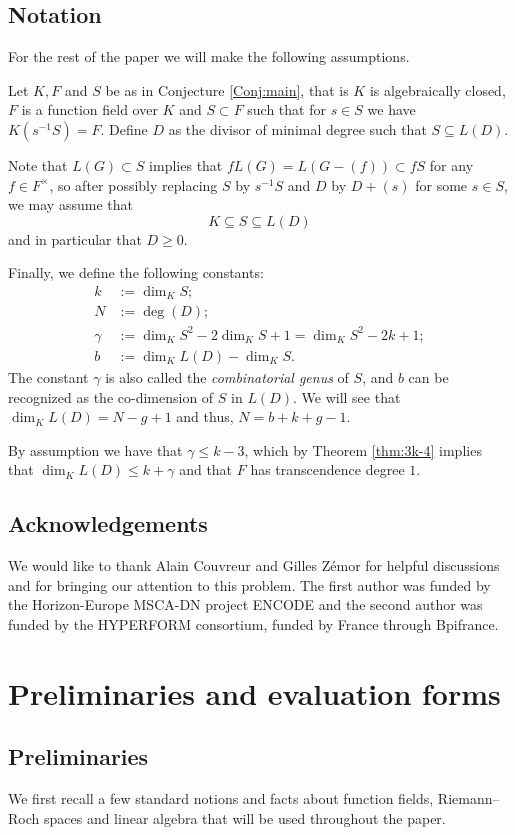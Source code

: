 \documentclass[12pt]{amsart}
\renewcommand{\leq}{\leqslant}
\theoremstyle{definition}
\begin{document}
	\subsection*{Notation}
	For the rest of the paper we will make the following assumptions. 
	
	Let $K, F$ and $S$ be as in Conjecture \ref{Conj:main}, that is $K$ is algebraically closed, $F$ is a function field over $K$ and $S\subset F$ such that for $s\in S$ we have $K(s^{-1}S) = F$. Define $D$ as the divisor of minimal degree such that $S \subseteq L(D).$ 
	
	Note that $L(G) \subset S$ implies that $fL(G) = L(G - (f)) \subset fS$ for any $f \in F^\times$, so after possibly replacing $S$ by $s^{-1}S$ and $D$ by $D + (s)$ for some $s\in S$, we may assume that
	$$K\subseteq S\subseteq L(D)$$
	and in particular that $ D\ge 0$.
	
	Finally, we define the following constants: 
	\begin{align*}
		k&:= \dim_K S;\\
		N &:= \deg (D); \\
		\gamma &:= \dim_K S^2 - 2\dim_K S + 1= \dim_K S^2 - 2k + 1; \\
		b &:= \dim_K L(D)  - \dim_K S.
	\end{align*}
	The constant $\gamma$ is also called the \textit{combinatorial genus} of $S$, and $b$ can be recognized as the co-dimension of $S$ in $L(D)$. We will see that $\dim_K L(D) = N - g + 1$ and thus, $N = b + k + g - 1.$
	
	By assumption we have that $\gamma \leq k-3$, which by Theorem \ref{thm:3k-4}  implies that $\dim_K L(D) \leq k + \gamma$ and that $F$ has transcendence degree $1$. 
	
	\subsection*{Acknowledgements}
	We would like to thank Alain Couvreur and Gilles Z\'emor for helpful discussions and for bringing our attention to this problem. The first author was funded by the Horizon-Europe MSCA-DN project ENCODE and the second author was funded by the HYPERFORM consortium, funded by France through Bpifrance.
	
	\section{Preliminaries and evaluation forms}\label{sec:pre}
	\subsection{Preliminaries}
	We first recall a few standard notions and facts about function fields, Riemann–Roch spaces and linear algebra that will be used throughout the paper.
	
\end{document}

